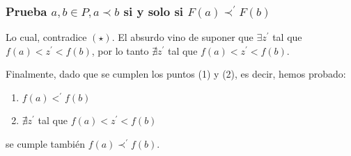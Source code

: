 \begin{frame}
	\frametitle{Prueba $a, b \in P, a \prec b$ si y solo si $F(a) \prec^{\prime} F(b)$}

	\begin{block}{}
		\PN Lo cual, contradice $(\star)$. El absurdo vino de suponer que $\exists z^{\prime}$ tal que $f(a) < z^{\prime} <
		f(b)$, por lo tanto $\nexists z^{\prime}$ tal que $f(a) < z^{\prime} < f(b)$.

		\vspace{5mm}
		\PN Finalmente, dado que se cumplen los puntos (1) y (2), es decir, hemos probado:
		\begin{enumerate}
	    \item $f(a) <^{\prime} f(b)$
	    \item $\nexists z^{\prime}$ tal que $f(a) < z^{\prime} < f(b)$
	  \end{enumerate}

		\vspace{5mm}
		\PN se cumple también $f(a) \prec^{\prime} f(b)$.
	\end{block}
\end{frame}
